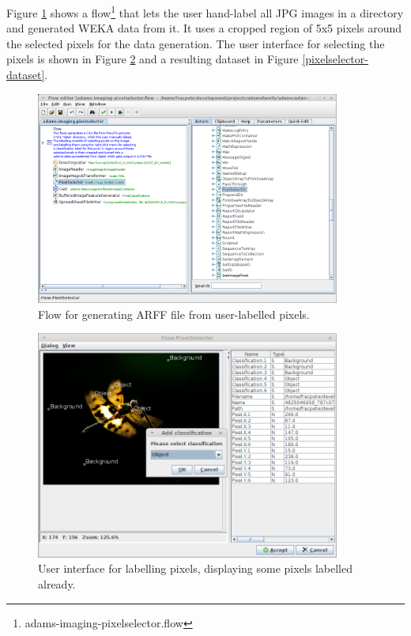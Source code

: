 \documentclass[a4paper]{book}
\begin{document}
Figure \ref{pixelselector-flow} shows a
flow\footnote{adams-imaging-pixelselector.flow} that lets the user hand-label
all JPG images in a directory and generated WEKA data from it. It uses a cropped
region of 5x5 pixels around the selected pixels for the data generation. The
user interface for selecting the pixels is shown in Figure
\ref{pixelselector-interaction} and a resulting dataset in Figure
\ref{pixelselector-dataset}.

\begin{figure}[htb]
  \centering
  \includegraphics[width=10.0cm]{images/pixelselector-flow.png}
  \caption{Flow for generating ARFF file from user-labelled pixels.}
  \label{pixelselector-flow}
\end{figure}

\begin{figure}[htb]
  \centering
  \includegraphics[width=10.0cm]{images/pixelselector-interaction.png}
  \caption{User interface for labelling pixels, displaying some pixels
  labelled already.}
  \label{pixelselector-interaction}
\end{figure}
\end{document}
